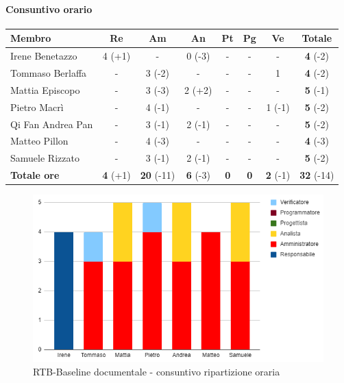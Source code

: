 \paragraph{Consuntivo orario}
\begin{center}
	\renewcommand{\arraystretch}{1.8} %
	\begin{tabular}{ |m{8em}|c|c|c|c|c|c|c| }
	\hline
	\textbf{Membro} & \textbf{Re} & \textbf{Am} &  \textbf{An} &  \textbf{Pt} &  \textbf{Pg} &  \textbf{Ve} &  \textbf{Totale}\\
    \hline
    Irene Benetazzo   & 4 (+1) & -      & 0 (-3) & - & - & -     & \textbf{4} (-2) \\
    \hline
    Tommaso Berlaffa  & -      & 3 (-2) & -      & - & - & 1      & \textbf{4} (-2) \\
    \hline
    Mattia Episcopo   & -      & 3 (-3) & 2 (+2) & - & - & -      & \textbf{5} (-1) \\
    \hline
    Pietro Macrì      & -      & 4 (-1) & -      & - & - & 1 (-1) & \textbf{5} (-2) \\
    \hline
    Qi Fan Andrea Pan & -      & 3 (-1) & 2 (-1) & - & - & -      & \textbf{5} (-2) \\
    \hline
    Matteo Pillon     & -      & 4 (-3) & -      & - & - & -      & \textbf{4} (-3) \\
    \hline
    Samuele Rizzato   & -      & 3 (-1) & 2 (-1) & - & - & -      & \textbf{5} (-2) \\
    \hline
    \textbf{Totale ore} & \textbf{4} (+1) & \textbf{20} (-11) &  \textbf{6} (-3) &  \textbf{0} &  \textbf{0} &  \textbf{2} (-1) &  \textbf{32} (-14)\\
    \hline
	\end{tabular}
\end{center}
\begin{figure}[H]
    \centering\includegraphics{images/consuntivo/RTB-documentale-ore.png}
    \caption{RTB-Baseline documentale - consuntivo ripartizione oraria}
\end{figure}

